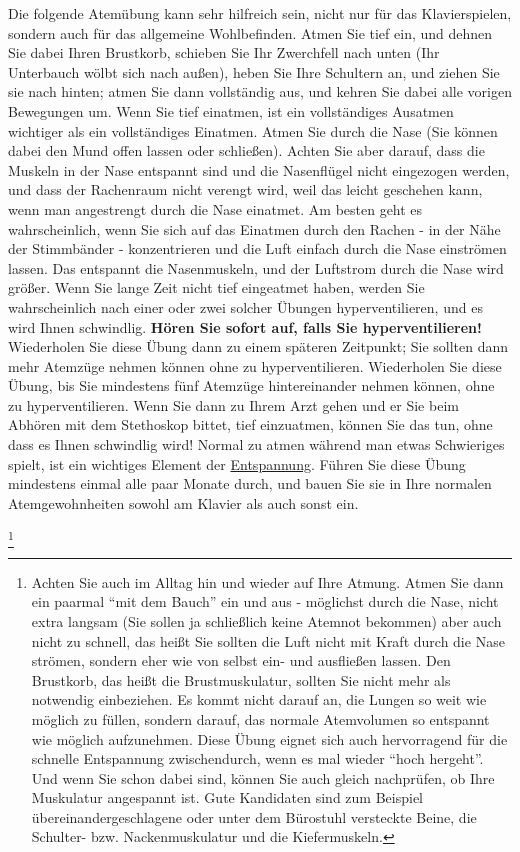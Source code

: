 Die folgende Atemübung kann sehr hilfreich sein, nicht nur für das Klavierspielen, sondern auch für das allgemeine Wohlbefinden.
Atmen Sie tief ein, und dehnen Sie dabei Ihren Brustkorb, schieben Sie Ihr Zwerchfell nach unten (Ihr Unterbauch wölbt sich nach außen), heben Sie Ihre Schultern an, und ziehen Sie sie nach hinten; atmen Sie dann vollständig aus, und kehren Sie dabei alle vorigen Bewegungen um.
Wenn Sie tief einatmen, ist ein vollständiges Ausatmen wichtiger als ein vollständiges Einatmen.
Atmen Sie durch die Nase (Sie können dabei den Mund offen lassen oder schließen). Achten Sie aber darauf, dass die Muskeln in der Nase entspannt sind und die Nasenflügel nicht eingezogen werden, und dass der Rachenraum nicht verengt wird, weil das leicht geschehen kann, wenn man angestrengt durch die Nase einatmet. Am besten geht es wahrscheinlich, wenn Sie sich auf das Einatmen durch den Rachen - in der Nähe der Stimmbänder - konzentrieren und die Luft einfach durch die Nase einströmen lassen. Das entspannt die Nasenmuskeln, und der Luftstrom durch die Nase wird größer.
Wenn Sie lange Zeit nicht tief eingeatmet haben, werden Sie wahrscheinlich nach einer oder zwei solcher Übungen hyperventilieren, und es wird Ihnen schwindlig. \textbf{Hören Sie sofort auf, falls Sie hyperventilieren!}
Wiederholen Sie diese Übung dann zu einem späteren Zeitpunkt; Sie sollten dann mehr Atemzüge nehmen können ohne zu hyperventilieren.
Wiederholen Sie diese Übung, bis Sie mindestens fünf Atemzüge hintereinander nehmen können, ohne zu hyperventilieren.
Wenn Sie dann zu Ihrem Arzt gehen und er Sie beim Abhören mit dem Stethoskop bittet, tief einzuatmen, können Sie das tun, ohne dass es Ihnen schwindlig wird!
Normal zu atmen während man etwas Schwieriges spielt, ist ein wichtiges Element der \hyperref[c1ii14]{Entspannung}.
Führen Sie diese Übung mindestens einmal alle paar Monate durch, und bauen Sie sie in Ihre normalen Atemgewohnheiten sowohl am Klavier als auch sonst ein.

\label{c1ii21uebung}\footnote{Achten Sie auch im Alltag hin und wieder auf Ihre Atmung. Atmen Sie dann ein paarmal \enquote{mit dem Bauch} ein und aus - möglichst durch die Nase, nicht extra langsam (Sie sollen ja schließlich keine Atemnot bekommen) aber auch nicht zu schnell, das heißt Sie sollten die Luft nicht mit Kraft durch die Nase strömen, sondern eher wie von selbst ein- und ausfließen lassen. Den Brustkorb, das heißt die Brustmuskulatur, sollten Sie nicht mehr als notwendig einbeziehen. Es kommt nicht darauf an, die Lungen so weit wie möglich zu füllen, sondern darauf, das normale Atemvolumen so entspannt wie möglich aufzunehmen. Diese Übung eignet sich auch hervorragend für die schnelle Entspannung zwischendurch, wenn es mal wieder \enquote{hoch hergeht}. Und wenn Sie schon dabei sind, können Sie auch gleich nachprüfen, ob Ihre Muskulatur angespannt ist. Gute Kandidaten sind zum Beispiel übereinandergeschlagene oder unter dem Bürostuhl versteckte Beine, die Schulter- bzw. Nackenmuskulatur und die Kiefermuskeln.}

